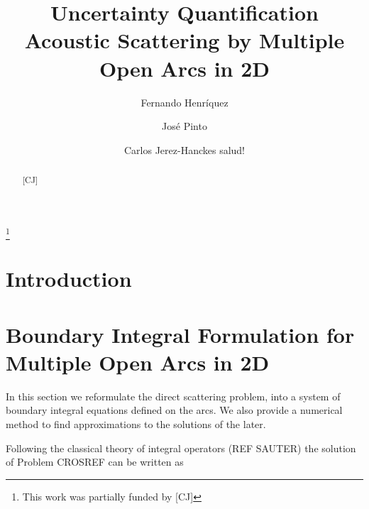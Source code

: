 \documentclass[10pt,reqno]{amsart}
\theoremstyle{remark}
\newcommand{\com}[1]{{{\color{red} [#1]}}}
\numberwithin{equation}{section}
\begin{document}
\title[]{Uncertainty Quantification Acoustic Scattering by Multiple Open Arcs in 2D}
\author[Fernando Henr\'iquez]{Fernando Henr\'iquez} \address{Seminar for Applied Mathematics, ETH Z$\ddot{\mbox{u}}$rich, CH-8092
  Z$\ddot{\mbox{u}}$rich, Switzerland} 
\author[Jos\'e Pinto]{Jos\'e Pinto} \address{School of Engineering, Pontificia
  Universidad Cat\'olica de Chile, Santiago, Chile} 
\author[Carlos Jerez-Hanckes]{Carlos Jerez-Hanckes salud!} \address{School of Engineering, Pontificia
  Universidad Cat\'olica de Chile, Santiago, Chile} 
  
\thanks{This work was partially funded by \com{CJ}}

\maketitle

\begin{abstract}
\com{CJ}


\end{abstract}

\newpage

\tableofcontents

\newpage

\section{Introduction}
\label{sec:intro}

\section{Boundary Integral Formulation for Multiple Open Arcs in 2D}
\label{sec:BIF_2D}

In this section we reformulate the direct scattering problem, into a system of boundary integral equations defined on the arcs. We also provide a numerical method to find approximations to the solutions of the later. 

Following the classical theory of integral operators (REF SAUTER) the solution of Problem CROSREF can be written as 
\end{document}
